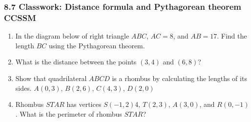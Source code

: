 

\fancyhead[LE]{\thepage}



\subsubsection*{8.7 Classwork: Distance formula and Pythagorean theorem \hfill CCSSM}
\begin{enumerate}
\item In the diagram below of right triangle $ABC$, $AC=8$, and $AB=17$. Find the length $BC$ using the Pythagorean theorem.
\begin{flushright}
\end{flushright}

\item What is the distance between the points $(3,4)$ and $(6,8)$? \vspace{4cm}

\item Show that quadrilateral $ABCD$ is a rhombus by calculating the lengths of its sides. $A(0,3)$, $B(2,6)$, $C(4,3)$, $D(2,0)$
\begin{flushright}
\end{flushright}

\newpage
\item Rhombus $STAR$ has vertices $S(-1,2)$4, $T(2,3)$, $A(3,0)$, and $R(0,-1)$. What is the perimeter of rhombus $STAR$? \vspace{7cm}


\end{enumerate}
